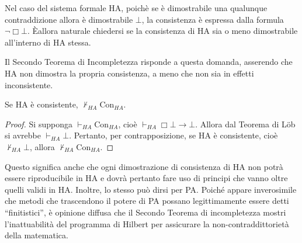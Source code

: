 Nel caso del sistema formale HA, poichè se è dimostrabile una qualunque contraddizione allora è dimostrabile $\bot$, la consistenza è espressa dalla formula $\neg\Box\bot$. \`{E}allora naturale chiedersi se la consistenza di HA sia o meno dimostrabile all'interno di HA stessa.

Il Secondo Teorema di Incompletezza risponde a questa domanda, asserendo che HA non dimostra la propria consistenza, a meno che non sia in effetti inconsistente.

\begin{thm}
Se HA è consistente, $\not\vdash_{HA}\mathrm{Con}_{HA}$.
\end{thm}

\begin{proof} Si supponga $\vdash_{HA}\mathrm{Con}_{HA}$, cioè $\vdash_{HA}\Box\bot\to\bot$. Allora dal Teorema di L\"ob si avrebbe $\vdash_{HA}\bot$. Pertanto, per contrapposizione, se HA è consistente, cioè $\not\vdash_{HA}\bot$, allora $\not\vdash_{HA}\mathrm{Con}_{HA}$.
\end{proof}

\noindent Questo significa anche che ogni dimostrazione di consistenza di HA non potrà essere riproducibile in HA e dovrà pertanto fare uso di principi che vanno oltre quelli validi in HA. Inoltre, lo stesso può dirsi per PA. Poiché appare inverosimile che metodi che trascendono il potere di PA possano legittimamente essere detti ``finitistici'', è opinione diffusa che il Secondo Teorema di incompletezza mostri l'inattuabilità del programma di Hilbert per assicurare la non-contraddittorietà della matematica.

